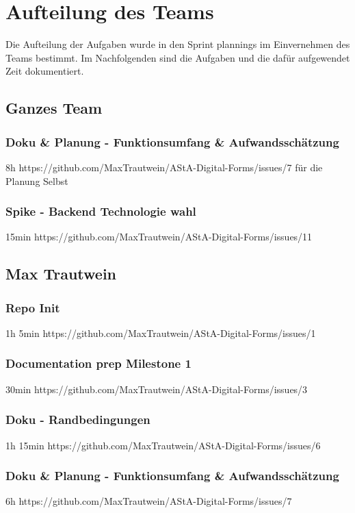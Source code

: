 \chapter{Aufteilung des Teams}\label{ch:aufteilung-des-teams}
Die Aufteilung der Aufgaben wurde in den Sprint plannings im Einvernehmen des Teams bestimmt.
Im Nachfolgenden sind die Aufgaben und die dafür aufgewendet Zeit dokumentiert.

\section{Ganzes Team}

\subsection{Doku & Planung - Funktionsumfang & Aufwandsschätzung}
8h
https://github.com/MaxTrautwein/AStA-Digital-Forms/issues/7
für die Planung Selbst

\subsection{Spike - Backend Technologie wahl }
15min
https://github.com/MaxTrautwein/AStA-Digital-Forms/issues/11

\section{Max Trautwein}\label{sec:max-trautwein}

\subsection{Repo Init}
1h 5min
https://github.com/MaxTrautwein/AStA-Digital-Forms/issues/1
\subsection{Documentation prep Milestone 1}
30min
https://github.com/MaxTrautwein/AStA-Digital-Forms/issues/3
\subsection{Doku - Randbedingungen}
1h 15min
https://github.com/MaxTrautwein/AStA-Digital-Forms/issues/6
\subsection{Doku & Planung - Funktionsumfang & Aufwandsschätzung}
6h
https://github.com/MaxTrautwein/AStA-Digital-Forms/issues/7

